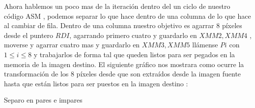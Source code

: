 Ahora hablemos un poco mas de la iteración dentro del un ciclo de nuestro código ASM , podemos separar lo que hace dentro de una columna de lo que hace al cambiar de fila. Dentro de una columna nuestro objetivo es agarrar 8 píxeles desde el puntero $RDI$, agarrando primero cuatro y guardarlo en $XMM2, XMM4$ , moverse y agarrar cuatro mas y guardarlo en $XMM3, XMM5$ llámense $Pi$ con $1\leq i\leq 8$ y trabajarlos de forma tal que queden listos para ser pegados en la memoria de la imagen destino. El siguiente gráfico nos mostrara como ocurre la transformación de los 8 píxeles desde que son extraídos desde la imagen fuente hasta que están listos para ser puestos en la imagen destino : 

\begin{center}
\end{center}

Separo en pares e impares

